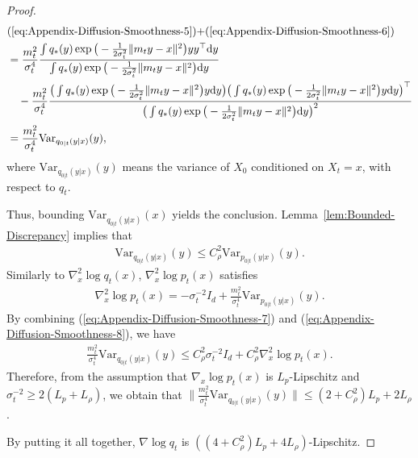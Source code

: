 \begin{proof}
    \begin{align}
       & \text{(\ref{eq:Appendix-Diffusion-Smoothness-5})+(\ref{eq:Appendix-Diffusion-Smoothness-6})}
       \\ & = \frac{m_t^2}{\sigma_t^4}\frac{\int q_*(y)\exp\big(-\frac{1}{2\sigma_t^2}\|m_t y - x\|^2\big)yy^\top\mathrm{d}y}{\int q_*(y)\exp\big(-\frac{1}{2\sigma_t^2}\|m_t y - x\|^2\big)\mathrm{d}y}
      \\ & \quad - \frac{m_t^2}{\sigma_t^4}\frac{\big(\int q_*(y)\exp\big(-\frac{1}{2\sigma_t^2}\|m_t y - x\|^2\big)y\mathrm{d}y\big)\big(\int q_*(y)\exp\big(-\frac{1}{2\sigma_t^2}\|m_t y - x\|^2\big)y\mathrm{d}y\big)^\top}{\big(\int q_*(y)\exp\big(-\frac{1}{2\sigma_t^2}\|m_t y - x\|^2\big)\mathrm{d}y\big)^2}
     \\ & =\frac{m_t^2}{\sigma_t^4}\mathrm{Var}_{q_{0|t}(y|x)}(y),
    \end{align}
    where $\mathrm{Var}_{q_{0|t}(y|x)}(y)$ means the variance of $X_0$ conditioned on $X_t=x$, with respect to $q_t$.

    Thus, bounding $\mathrm{Var}_{q_{0|t}(y|x)}(x)$ yields the conclusion. 
    Lemma~\ref{lem:Bounded-Discrepancy} implies that
    \begin{align}
        \mathrm{Var}_{q_{0|t}(y|x)}(y) \leq C_\rho^2 \mathrm{Var}_{p_{0|t}(y|x)}(y).
        \label{eq:Appendix-Diffusion-Smoothness-7}
    \end{align}
    Similarly to $\nabla_x^2 \log q_t(x)$, $\nabla_x^2 \log p_t(x)$ satisfies
    \begin{align}
        \nabla_x^2 \log p_t(x) = -\sigma_t^{-2}I_d + \frac{m_t^2}{\sigma_t^4}\mathrm{Var}_{p_{0|t}(y|x)}(y).
        \label{eq:Appendix-Diffusion-Smoothness-8}
    \end{align}
    By combining (\ref{eq:Appendix-Diffusion-Smoothness-7}) and (\ref{eq:Appendix-Diffusion-Smoothness-8}), we have
    \begin{align}
        \frac{m_t^2}{\sigma_t^4} \mathrm{Var}_{q_{0|t}(y|x)}(y) \leq C_\rho^2
        \sigma_t^{-2}I_d + C_\rho^2\nabla_x^2 \log p_t(x).
    \end{align}
    Therefore, from the assumption that $\nabla_x \log p_t(x)$ is $L_p$-Lipschitz and $\sigma_t^{-2}\geq 2(L_p+L_\rho)$, we obtain that $ \|\frac{m_t^2}{\sigma_t^4} \mathrm{Var}_{q_{0|t}(y|x)}(y)\|\leq (2+C_\rho^2) L_p + 2L_\rho$. 

    By putting it all together, $\nabla \log q_t$ is $((4+C_\rho^2) L_p + 4L_\rho)$-Lipschitz.
\end{proof}

